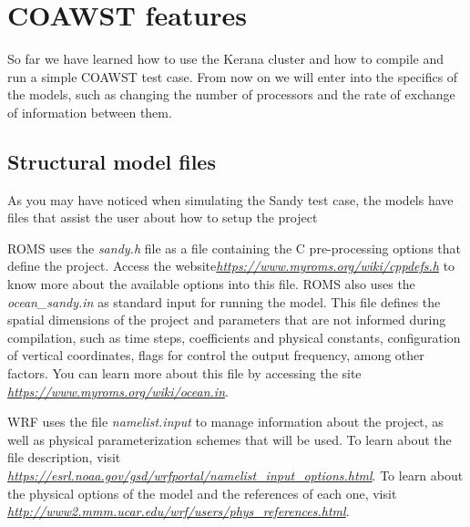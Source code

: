 \chapter{COAWST features}
\bigskip
\noindent So far we have learned how to use the Kerana cluster and how to compile and run a simple COAWST test case.
From now on we will enter into the specifics of the models, such as changing the number of processors
and the rate of exchange of information between them.
\bigskip

\section{Structural model files}
\bigskip

\noindent As you may have noticed when simulating the Sandy test case, the models have files that assist the user about how to setup the project

\bigskip

\noindent ROMS uses the \textit{sandy.h} file as a file containing the C pre-processing options that define the project.
Access the website\textcolor{bleu_cite}{\href{https://www.myroms.org/wiki/cppdefs.h}{\textit{https://www.myroms.org/wiki/cppdefs.h}}} 
to know more about the available options into this file. ROMS also uses the \textit{ocean\_sandy.in} as standard input for
running the model. This file defines the spatial dimensions of the project and parameters that are not informed during compilation,
such as time steps, coefficients and physical constants, configuration of vertical coordinates, flags for
control the output frequency, among other factors. You can learn more about this file by accessing the
site \textcolor{bleu_cite}{\href{https://www.myroms.org/wiki/ocean.in}{\textit{https://www.myroms.org/wiki/ocean.in}}}.
\bigskip

\noindent WRF uses the file \textit{namelist.input} to manage information about the project, as well as
physical parameterization schemes that will be used. To learn about the file description,
visit \textcolor{bleu_cite}{\href{https://esrl.noaa.gov/gsd/wrfportal/namelist\_input\_options.html}{\textit{https://esrl.noaa.gov/gsd/wrfportal/namelist\_input\_options.html}}}.
To learn about the physical options of the model and the references of each one, visit \textcolor{bleu_cite}{\href{http://www2.mmm.ucar.edu/wrf/users/phys\_references.html}{\textit{http://www2.mmm.ucar.edu/wrf/users/phys\_references.html}}}.
\bigskip

